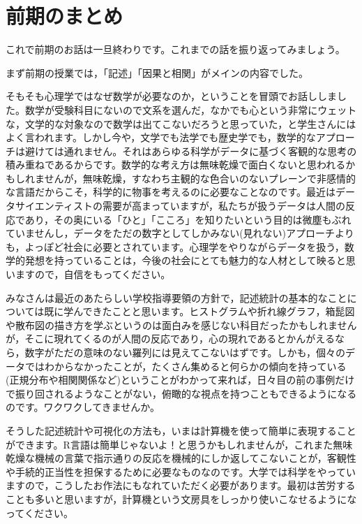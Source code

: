 \documentclass{ltjbook}
\begin{document}
\chapter{前期のまとめ}
\label{chapter15}
これで前期のお話は一旦終わりです。これまでの話を振り返ってみましょう。

まず前期の授業では，「記述」「因果と相関」がメインの内容でした。

そもそも心理学ではなぜ数学が必要なのか，ということを冒頭でお話ししました。数学が受験科目にないので文系を選んだ，なかでも心という非常にウェットな，文学的な対象なので数学は出てこないだろうと思っていた，と学生さんにはよく言われます。しかし今や，文学でも法学でも歴史学でも，数学的なアプローチは避けては通れません。それはあらゆる科学がデータに基づく客観的な思考の積み重ねであるからです。数学的な考え方は無味乾燥で面白くないと思われるかもしれませんが，無味乾燥，すなわち主観的な色合いのないプレーンで非感情的な言語だからこそ，科学的に物事を考えるのに必要なことなのです。最近はデータサイエンティストの需要が高まっていますが，私たちが扱うデータは人間の反応であり，その奥にいる「ひと」「こころ」を知りたいという目的は微塵もぶれていませんし，データをただの数字としてしかみない(見れない)アプローチよりも，よっぽど社会に必要とされています。心理学をやりながらデータを扱う，数学的発想を持っていることは，今後の社会にとても魅力的な人材として映ると思いますので，自信をもってください。

みなさんは最近のあたらしい学校指導要領の方針で，記述統計の基本的なことについては既に学んできたことと思います。ヒストグラムや折れ線グラフ，箱髭図や散布図の描き方を学ぶというのは面白みを感じない科目だったかもしれませんが，そこに現れてくるのが人間の反応であり，心の現れであるとかんがえるなら，数字がただの意味のない羅列には見えてこないはずです。しかも，個々のデータではわからなかったことが，たくさん集めると何らかの傾向を持っている(正規分布や相関関係など)ということがわかって来れば，日々目の前の事例だけで振り回されるようなことがない，俯瞰的な視点を持つこともできるようになるのです。ワクワクしてきませんか。

そうした記述統計や可視化の方法も，いまは計算機を使って簡単に表現することができます。R言語は簡単じゃないよ！と思うかもしれませんが，これまた無味乾燥な機械の言葉で指示通りの反応を機械的にしか返してこないことが，客観性や手続的正当性を担保するために必要なものなのです。大学では科学をやっていますので，こうしたお作法にもなれていただく必要があります。最初は苦労することも多いと思いますが，計算機という文房具をしっかり使いこなせるようになってください。
\end{document}
